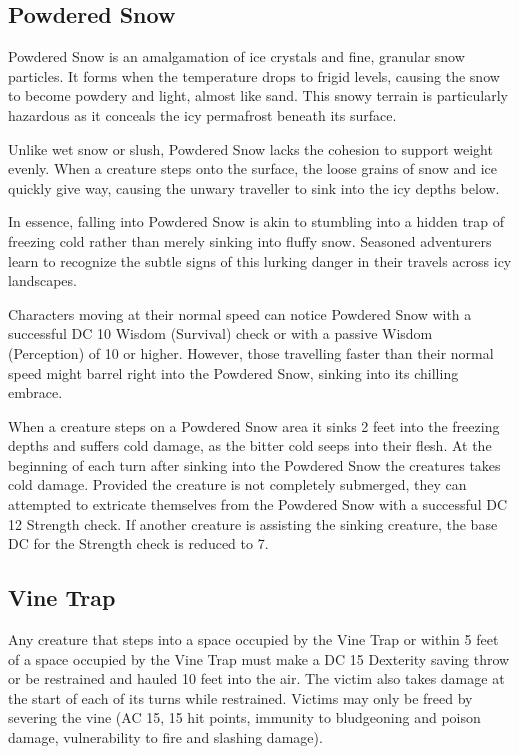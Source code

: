 \subsection*{Powdered Snow}
\label{sec:PowderedSnow}
Powdered Snow is an amalgamation of ice crystals and fine, granular snow particles. It forms when the temperature drops to frigid levels, causing the snow to become powdery and light, almost like sand. This snowy terrain is particularly hazardous as it conceals the icy permafrost beneath its surface.

Unlike wet snow or slush, Powdered Snow lacks the cohesion to support weight evenly. When a creature steps onto the surface, the loose grains of snow and ice quickly give way, causing the unwary traveller to sink into the icy depths below.

In essence, falling into Powdered Snow is akin to stumbling into a hidden trap of freezing cold rather than merely sinking into fluffy snow. Seasoned adventurers learn to recognize the subtle signs of this lurking danger in their travels across icy landscapes.

Characters moving at their normal speed can notice Powdered Snow with a successful DC 10 Wisdom (Survival) check or with a passive Wisdom (Perception) of 10 or higher. However, those travelling faster than their normal speed might barrel right into the Powdered Snow, sinking into its chilling embrace.

When a creature steps on a Powdered Snow area it sinks 2 feet into the freezing depths and suffers  cold damage, as the bitter cold seeps into their flesh. At the beginning of each turn after sinking into the Powdered Snow the creatures takes  cold damage. Provided the creature is not completely submerged, they can attempted to extricate themselves from the Powdered Snow with a successful DC 12 Strength check. If another creature is assisting the sinking creature, the base DC for the Strength check is reduced to 7.
\subsection*{Vine Trap}
\label{sec:VineTrap}
Any creature that steps into a space occupied by the Vine Trap or within 5 feet of a space occupied by the Vine Trap must make a DC 15 Dexterity saving throw or be restrained and hauled 10 feet into the air. The victim also takes  damage at the start of each of its turns while restrained. Victims may only be freed by severing the vine (AC 15, 15 hit points, immunity to bludgeoning and poison damage, vulnerability to fire and slashing damage).

